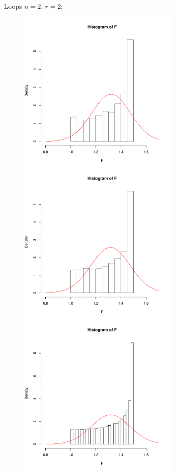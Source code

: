 \documentclass{beamer}
\begin{document}
\begin{frame}{Loops}
$n=2$, $r=2$:

\begin{figure}

\begin{overprint}
\centerline{\includegraphics[width=8cm]{Primer_1e+3.pdf}}
\centerline{\includegraphics[width=8cm]{Primer_1e+4.pdf}}
\centerline{\includegraphics[width=8cm]{Primer_1e+5.pdf}}

\end{overprint}
\end{figure}
\end{frame}
\end{document}
